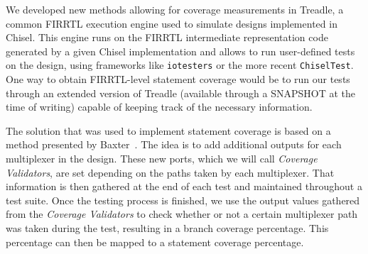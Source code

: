 \documentclass[runningheads]{llncs}
\begin{document}
We developed new methods allowing for coverage measurements in Treadle, a common FIRRTL execution engine used to simulate designs implemented in Chisel. This engine runs on the FIRRTL intermediate representation code generated by a given Chisel implementation and allows to run user-defined tests on the design, using frameworks like \texttt{iotesters} or the more recent \texttt{ChiselTest}. One way to obtain FIRRTL-level statement coverage would be to run our tests through an extended version of Treadle (available through a SNAPSHOT at the time of writing) capable of keeping track of the necessary information.

The solution that was used to implement statement coverage is based on a method presented by Baxter~\cite{branch-cov-made-easy:2002}. The idea is to add additional outputs for each multiplexer in the design. These new ports, which we will call \textit{Coverage Validators}, are set depending on the paths taken by each multiplexer. That information is then gathered at the end of each test and maintained throughout a test suite. Once the testing process is finished, we use the output values gathered from the \textit{Coverage Validators} to check whether or not a certain multiplexer path was taken during the test, resulting in a branch coverage percentage. This percentage can then be mapped to a statement coverage percentage.
\end{document}
